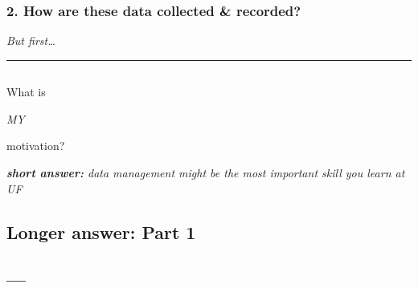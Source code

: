 \documentclass[
  letterpaper,
  DIV=11,
  numbers=noendperiod]{scrartcl}
\begin{document}
\hypertarget{how-are-these-data-collected-recorded}{%
\subsubsection{2. How are these data collected \&
recorded?}\label{how-are-these-data-collected-recorded}}

\emph{But first\ldots{}}

\begin{center}\rule{0.5\linewidth}{0.5pt}\end{center}

\hypertarget{section-6}{%
\subsection{}\label{section-6}}

What is

\emph{MY}

motivation?

\emph{\textbf{short answer:} data management might be the most important
skill you learn at UF}

\hypertarget{longer-answer-part-1}{%
\subsection{\texorpdfstring{\textbf{Longer answer:} Part
1}{Longer answer: Part 1}}\label{longer-answer-part-1}}

\hypertarget{section-7}{%
\subsection{}\label{section-7}}

\hypertarget{section-8}{%
\subsection{}\label{section-8}}

\hypertarget{section-9}{%
\subsection{}\label{section-9}}

\hypertarget{section-10}{%
\subsection{}\label{section-10}}

\hypertarget{section-11}{%
\subsection{---}\label{section-11}}
\end{document}
